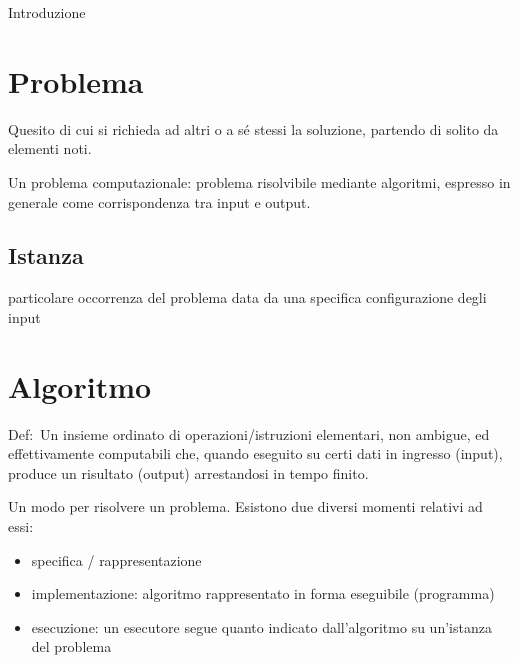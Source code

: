 \documentclass[
]{article}
\author{}
\date{}
\providecommand{\tightlist}{%
  \setlength{\itemsep}{0pt}\setlength{\parskip}{0pt}}
\begin{document}
{Introduzione}

{}

\section{\texorpdfstring{{Problema}}{Problema}}\label{h.x4gde96n6suz}

{Q}{uesito di cui si richieda ad altri o a sé stessi la soluzione,
partendo di solito da elementi noti.}

{Un problema computazionale: problema risolvibile mediante algoritmi,
espresso in generale come corrispondenza tra input e output.}

\subsection{\texorpdfstring{{Istanza}}{Istanza}}\label{h.dcxaldq8mbhu}

{particolare occorrenza del problema data da una specifica
configurazione degli input}

\section{\texorpdfstring{{Algoritmo}}{Algoritmo}}\label{h.n43i19gnahex}

{Def:}{~Un insieme ordinato di operazioni/istruzioni elementari, non
ambigue, ed effettivamente computabili che, quando eseguito su certi
dati in ingresso (input), produce un risultato (output) arrestandosi in
tempo finito.}

{}

{U}{n modo per risolvere un problema. Esistono due diversi momenti
relativi ad essi:}

\begin{itemize}
\tightlist
\item
  {specifica / rappresentazione}
\end{itemize}

\begin{itemize}
\tightlist
\item
  {implementazione: algoritmo rappresentato in forma eseguibile
  (programma)}
\end{itemize}

\begin{itemize}
\tightlist
\item
  {esecuzione: un esecutore segue quanto indicato dall'algoritmo su
  un'istanza del problema}
\end{itemize}
\end{document}
